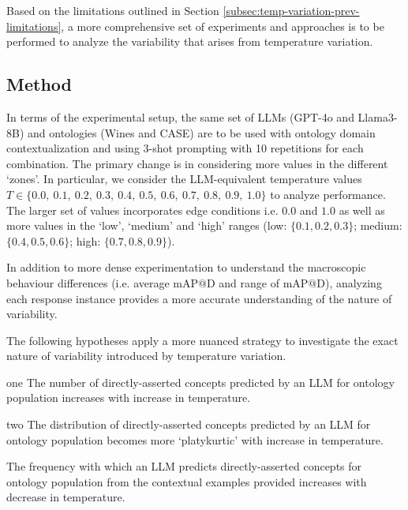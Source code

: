\documentclass[a4paper,colorinlistoftodos]{article}
\begin{document}
Based on the limitations outlined in Section
\ref{subsec:temp-variation-prev-limitations}, a more comprehensive set of
experiments and approaches is to be performed to analyze the variability that
arises from temperature variation.


\subsection{Method}
\label{subsec:new-temp-variation-method}


In terms of the experimental setup, the same set of LLMs (GPT-4o and
Llama3-8B) and ontologies (Wines and CASE) are to be used with ontology domain
contextualization and using 3-shot prompting with 10 repetitions for each
combination. The primary change is in considering more values in the different
`zones'. In particular, we consider the LLM-equivalent temperature values $T
\in \{0.0,\ 0.1,\ 0.2,\ 0.3,\ 0.4,\ 0.5,\ 0.6,\ 0.7,\ 0.8,\ 0.9,\ 1.0\}$ to
analyze performance. The larger set of values incorporates edge conditions
i.e. $0.0$ and $1.0$ as well as more values in the `low', `medium' and `high'
ranges (low: $\{0.1, 0.2, 0.3\}$; medium: $\{0.4, 0.5, 0.6\}$; high: $\{0.7,
0.8, 0.9\}$).

In addition to more dense experimentation to understand the macroscopic
behaviour differences (i.e. average $\text{mAP@D}$ and range of
$\text{mAP@D}$), analyzing each response instance provides a more accurate
understanding of the nature of variability.

The following hypotheses apply a more nuanced strategy to investigate the
exact nature of variability introduced by temperature variation.

\begin{hypothesis}{}{one}
  The number of directly-asserted concepts predicted by an
  LLM for ontology population increases with increase in temperature.
\end{hypothesis}

\begin{hypothesis}{}{two}
  The distribution of directly-asserted concepts predicted by an LLM for
  ontology population becomes more `platykurtic' with increase in temperature.
\end{hypothesis}

\begin{hypothesis} The frequency with which an LLM predicts directly-asserted
concepts for ontology population from the contextual examples provided
increases with decrease in temperature.
\end{hypothesis}
\end{document}
